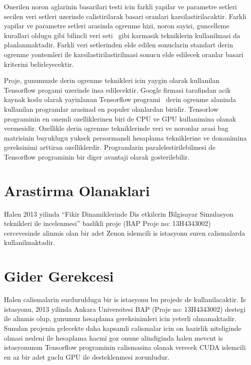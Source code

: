 Onerilen noron aglarinin basarilari testi icin farkli yapilar ve
parametre setleri secilen veri setleri uzerinde calistirilarak basari
oranlari karsilastirilacaktir. Farkli yapilar ve parametre setleri
arasinda ogrenme hizi, noron sayisi, guncelleme kurallari oldugu gibi
bilincli veri seti~\cite{DeSieno:1988} gibi karmasik tekniklerin
kullanilmasi da planlanmaktadir. Farkli veri setlerinden elde edilen
sonuclarin standart derin ogrenme yontemleri ile
karsilastirilastirilmasi sonucu elde edilecek oranlar basari kriterini
belirleyecektir.

Proje, gunumuzde derin ogrenme teknikleri icin yaygin olarak
kullanilan Tensorflow progami uzerinde insa edilecektir. Google
firmasi tarafindan acik kaynak kodu olarak yayinlanan Tensorflow
programi~\cite{Tensorflow} derin ogrenme alaninda kullanilan
programlar arasinad en populer olanlardan biridir. Tensorlow
programinin en onemli ozelliklerinen biri de CPU ve GPU kullanimina
olanak vermesidir. Ozellikle derin ogrenme tekniklerinde veri ve
noronlar arasi bag matrisinin buyuklugu yuksek persormansli hesaplama
tekniklerine ve donanimina gereksinimi arttiran
ozelliklerdir. Programlarin paralelestirilebilmesi de Tensorflow
programinin bir diger avantaji olarak gosterilebilir.

\section{Arastirma Olanaklari}


Halen 2013 yilinda ``Fikir Dinamiklerinde Dis etkilerin Bilgisayar
Simulasyon teknikleri ile incelenmesi'' baslikli proje (BAP Proje no:
13H4343002) cercevesinde alinmis olan bir adet Zenon islemcili is
istasyonu suren calismalarda kullanilmaktadir.


\section{Gider Gerekcesi}

Halen calismalarin surduruldugu bir is istasyonu bu projede de
kullanilacaktir. Is istasyonu, 2013 yilinda Ankara Universitesi BAP
(Proje no: 13H4343002) destegi ile alinmis olup, gunumuz hesaplama
gereksinimleri icin yeterli olmamaktadir. Sunulan projenin gelecekte
daha kapsamli calismalar icin on hazirlik niteliginde olmasi nedeni
ile hesaplama hacmi goz onune alindiginda halen mevcut is istasyonunun
Tensorflow programinin calismasina olanak verecek CUDA islemcili en az bir
adet guclu GPU ile desteklenmesi zorunludur.

